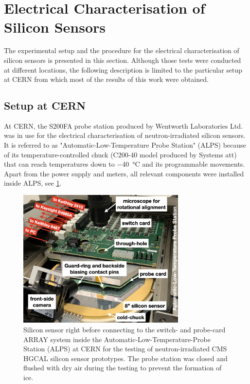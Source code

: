 \section{Electrical Characterisation of Silicon Sensors}
\label{sec:setup}
The experimental setup and the procedure for the electrical characterisation of silicon sensors is presented in this section.
Although those tests were conducted at different locations, the following description is limited to the particular setup at CERN from which most of the results of this work were obtained.

\subsection{Setup at CERN}
\label{subsec:setup_alps}
At CERN, the S200FA probe station produced by Wentworth Laboratories Ltd. was in use for the electrical characterisation of neutron-irradiated silicon sensors. 
It is referred to as "Automatic-Low-Temperature Probe Station" (ALPS) because of its temperature-controlled chuck (C200-40 model produced by Systems att) that can reach temperatures down to \SI{-40}{\celsius} and its programmable movements.
Apart from the power supply and meters, all relevant components were installed inside ALPS, see \ref{fig:ALPS_setup}.
\begin{figure}[h]
	\centering
	\includegraphics[width=0.75\textwidth]{figures/ALPS_photo_edit.jpeg}
	\caption{
		Silicon sensor right before connecting to the switch- and probe-card ARRAY system inside the Automatic-Low-Temperature-Probe Station (ALPS) at CERN for the testing of neutron-irradiated CMS HGCAL silicon sensor prototypes.
		The probe station was closed and flushed with dry air during the testing to prevent the formation of ice.
		}
		\label{fig:ALPS_setup}
	\end{figure}
